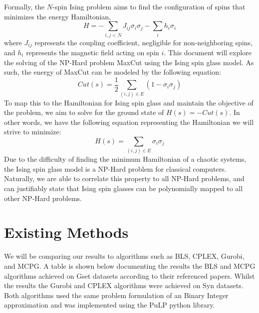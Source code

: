 \documentclass[conference]{IEEEtran}
\begin{document}
Formally, the $N$-spin Ising problem aims to find the configuration of spins that minimizes the energy Hamiltonian, 
\begin{equation}
H = -\sum_{i,j<N}J_{ij}\sigma_i\sigma_j - \sum_ih_i\sigma_i
\end{equation}
where $J_{ij}$ represents the coupling coefficient, negligible for non-neighboring spins, and $h_i$ represents the magnetic field acting on spin $i$. This document will explore the solving of the NP-Hard problem MaxCut using the Ising spin glass model. As such, the energy of MaxCut can be modeled by the following equation:
\begin{equation}
Cut(s) = \frac{1}{2}\sum_{(i,j)\in E}(1-\sigma_i\sigma_j)
\end{equation}
To map this to the Hamiltonian for Ising spin glass and maintain the objective of the problem, we aim to solve for the ground state of $H(s) = -Cut(s)$. In other words, we have the following equation representing the Hamiltonian we will strive to minimize:
\begin{equation}
H(s) = \sum_{(i,j)\in E}\sigma_i\sigma_j
\end{equation}
Due to the difficulty of finding the minimum Hamiltonian of a chaotic systems, the Ising spin glass model is a NP-Hard problem for classical computers. Naturally, we are able to correlate this property to all NP-Hard problems, and can justifiably state that Ising spin glasses can be polynomially mapped to all other NP-Hard problems\cite{b2}.

\section{Existing Methods}
We will be comparing our results to algorithms such as BLS, CPLEX, Gurobi, and MCPG. A table is shown below documenting the results the BLS and MCPG algorithms achieved on Gset datasets according to their referenced papers. Whilst the results the Gurobi and CPLEX algorithms were achieved on Syn datasets. Both algorithms used the same problem formulation of an Binary Integer approximation\cite{b5} and was implemented using the PuLP python library. 
\end{document}
